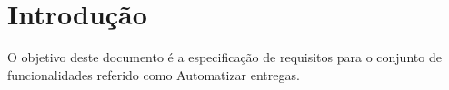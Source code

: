 \documentclass[
	12pt,				%
	openright,			%
	twoside,			%
	a4paper,			%
	english,			%
	french,				%
	spanish,			%
	brazil,				%
	]{abntex2}
\begin{document}
 
\frenchspacing
 
 
\imprimircapa
 
\tableofcontents*
\cleardoublepage
  
 
\textual
 
\chapter*[Introdução]{Introdução}
 
O objetivo deste documento é a especificação de requisitos para o conjunto de funcionalidades referido como Automatizar entregas.
 











 
\postextual
 
 
%
 


\end{document}
